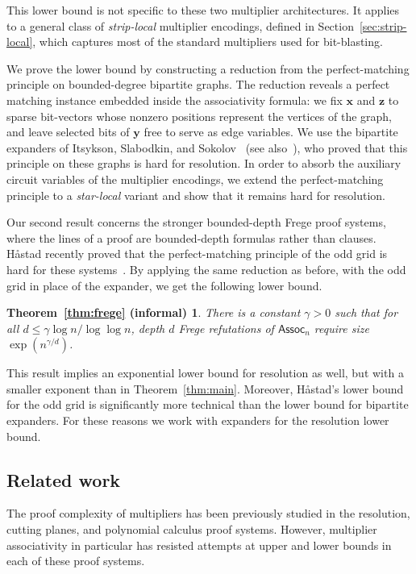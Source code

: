 \documentclass[11pt]{article}
\newtheorem*{informalfrege}{Theorem~\ref{thm:frege} (informal)}
\theoremstyle{definition}
\theoremstyle{remark}
\newcommand{\Assoc}{\mathsf{Assoc}}
\newcommand{\vv}[1]{\mathbf{#1}}
\begin{document}
This lower bound is not specific to these two multiplier architectures. It applies to a general class of \emph{strip-local} multiplier encodings, defined in Section~\ref{sec:strip-local}, which captures most of the standard multipliers used for bit-blasting.

We prove the lower bound by constructing a reduction from the perfect-matching principle on bounded-degree bipartite graphs. The reduction reveals a perfect matching instance embedded inside the associativity formula: we fix $\vv{x}$ and $\vv{z}$ to sparse bit-vectors whose nonzero positions represent the vertices of the graph, and leave selected bits of $\vv{y}$ free to serve as edge variables. We use the bipartite expanders of Itsykson, Slabodkin, and Sokolov~\cite{iss} (see also~\cite{ioss}), who proved that this principle on these graphs is hard for resolution. In order to absorb the auxiliary circuit variables of the multiplier encodings, we extend the perfect-matching principle to a \emph{star-local} variant and show that it remains hard for resolution.

Our second result concerns the stronger bounded-depth Frege proof systems, where the lines of a proof are bounded-depth formulas rather than clauses. H\r{a}stad recently proved that the perfect-matching principle of the odd grid is hard for these systems~\cite{hastad-php}. By applying the same reduction as before, with the odd grid in place of the expander, we get the following lower bound.

\begin{informalfrege}
There is a constant $\gamma>0$ such that for all $d\le\gamma\log n/\log\log n$, depth $d$ Frege refutations of $\Assoc_n$ require size $\exp(n^{\gamma/d})$.
\end{informalfrege}

This result implies an exponential lower bound for resolution as well, but with a smaller exponent than in Theorem~\ref{thm:main}. Moreover, H\r{a}stad's lower bound for the odd grid is significantly more technical than the lower bound for bipartite expanders. For these reasons we work with expanders for the resolution lower bound.

\subsection{Related work}
The proof complexity of multipliers has been previously studied in the resolution, cutting planes, and polynomial calculus proof systems. However, multiplier associativity in particular has resisted attempts at upper and lower bounds in each of these proof systems.
\end{document}
